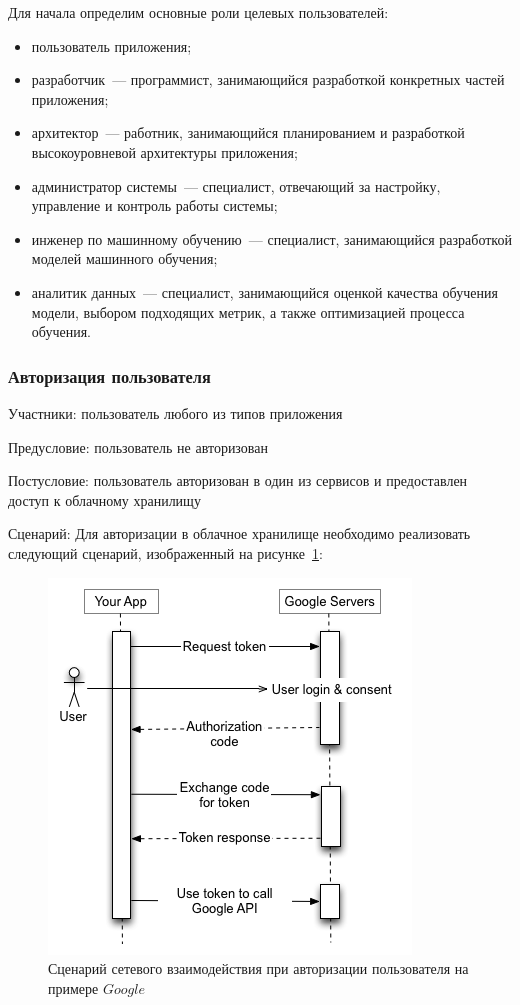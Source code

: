 Для начала определим основные роли целевых пользователей:
\begin{itemize}
    \item пользователь приложения;
    \item разработчик~--- программист, занимающийся разработкой конкретных частей приложения;
    \item архитектор~--- работник, занимающийся планированием и разработкой высокоуровневой архитектуры приложения;
    \item администратор системы~--- специалист, отвечающий за настройку, управление и контроль работы системы;
    \item инженер по машинному обучению~--- специалист, занимающийся разработкой моделей машинного обучения;
    \item аналитик данных~--- специалист, занимающийся оценкой качества обучения модели, выбором подходящих метрик, а также оптимизацией процесса обучения.
\end{itemize}

\subsubsection{Авторизация пользователя}
Участники: пользователь любого из типов приложения

Предусловие: пользователь не авторизован

Постусловие: пользователь авторизован в один из сервисов и предоставлен доступ к облачному хранилищу

Сценарий:
Для авторизации в облачное хранилище необходимо реализовать следующий сценарий, изображенный на рисунке~\ref{auth}:

\begin{figure}
    \includegraphics[scale=0.5]{img/use_cases/authorization.png}
    \caption{Сценарий сетевого взаимодействия при авторизации пользователя \cite{OAuth_google} на примере $Google$}
    \label{auth}
\end{figure}

